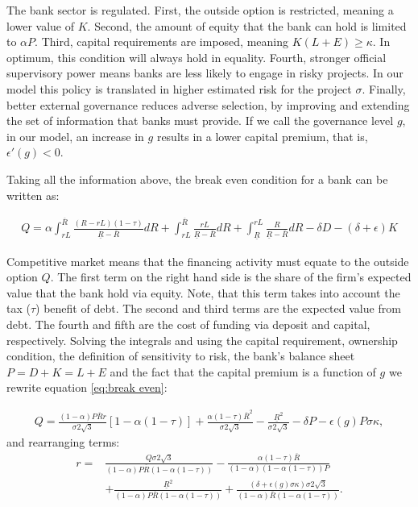\documentclass[12pt]{article}
\begin{document}
	The bank sector is regulated. First, the outside option is restricted, meaning a lower value of $K$. Second, the amount of equity that the bank can hold is limited to $\alpha P$. Third, capital requirements are imposed, meaning $K(L+E)\ge\kappa$. In optimum, this condition will always hold in equality. Fourth, stronger official supervisory power means banks are less likely to engage in risky projects. In our model this policy is translated in higher estimated risk for the project $\sigma$. Finally, better external governance reduces adverse selection, by improving and extending the set of information that banks must provide. If we call the governance level $g$, in our model, an increase in $g$ results in a lower capital premium, that is, $\epsilon'(g)<0$.
	
	Taking all the information above, the break even condition for a bank can be written as:  
	
		\begin{equation}
	\begin{aligned}
	Q=\alpha\int_{rL}^{\overline{R}}\frac{(R-rL)(1-\tau)}{\underline{R}-\overline{R}}dR+\int_{rL}^{\overline{R}}\frac{rL}{\underline{R}-\overline{R}}dR+\int_{\underline{R}}^{rL}\frac{R}{\underline{R}-\overline{R}}dR-\delta D-(\delta+\epsilon)K
	\end{aligned}
	\label{eq:break even}
	\end{equation}
	
	Competitive market means that the financing activity must equate to the outside option $Q$. The first term on the right hand side is the share of the firm's expected value that the bank hold via equity. Note, that this term takes into account the tax ($\tau$) benefit of debt. The second and third terms are the expected value from debt. The fourth and fifth are the cost of funding via deposit and capital, respectively. Solving the integrals and using the capital requirement, ownership condition, the definition of sensitivity to risk, the bank's balance sheet $P=D+K=L+E$ and the fact that the capital premium is a function of $g$ we rewrite equation \ref{eq:break even}:
		
			\begin{equation}
		\begin{aligned}
		Q=\frac{(1-\alpha)P\overline{R}r}{\sigma2\sqrt{3}}[1-\alpha(1-\tau)]+\frac{\alpha(1-\tau)\overline{R}^2}{\sigma2\sqrt{3}}-\frac{\underline{R}^2}{\sigma2\sqrt{3}}-\delta P-\epsilon(g)P\sigma\kappa,
		\end{aligned}
			\label{eq:break even solved}
		\end{equation} 
	and rearranging terms:
		\begin{equation}
	\begin{aligned}
	r=&\frac{Q\sigma2\sqrt{3}}{(1-\alpha)P\overline{R}(1-\alpha(1-\tau))}-\frac{\alpha(1-\tau)\overline{R}}{(1-\alpha)(1-\alpha(1-\tau))P}\\
	&+\frac{\underline{R}^2}{(1-\alpha)P\overline{R}(1-\alpha(1-\tau))}+\frac{(\delta+\epsilon(g)\sigma\kappa)\sigma2\sqrt{3}}{(1-\alpha)\overline{R}(1-\alpha(1-\tau))}.	\end{aligned}
		\label{eq:interest rate}
	\end{equation} 
	
\end{document}
